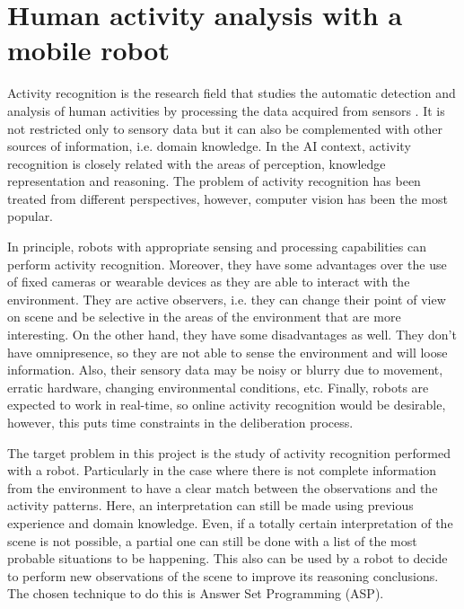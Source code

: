 \section{Human activity analysis with a mobile robot}
Activity recognition is the research field that studies the automatic detection and analysis of human activities by processing the data acquired from sensors \citep{Aggarwal14_HumActRec3DRev}. 
It is not restricted only to sensory data but it can also be complemented with other sources of information, i.e. domain knowledge.
In the AI context, activity recognition is closely related with the areas of perception, knowledge representation and reasoning. 
The problem of activity recognition has been treated from different perspectives, however, computer vision has been the most popular.

In principle, robots with appropriate sensing and processing capabilities can perform activity recognition. 
Moreover, they have some advantages over the use of fixed cameras or wearable devices as they are able to interact with the environment. 
They are active observers, i.e. they can change their point of view on scene and be selective in the areas of the environment that are more interesting. 
On the other hand, they have some disadvantages as well. 
They don't have omnipresence, so they are not able to sense the environment and will loose information. 
Also, their sensory data may be noisy or blurry due to movement, erratic hardware, changing environmental conditions, etc. 
Finally, robots are expected to work in real-time, so online activity recognition would be desirable, however, this puts time constraints in the deliberation process.


The target problem in this project is the study of activity recognition performed with a robot. 
Particularly in the case where there is not complete information from the environment to have a clear match between the observations and the activity patterns. 
Here, an interpretation can still be made using previous experience and domain knowledge. 
Even, if a totally certain interpretation of the scene is not possible, a partial one can still be done with a list of the most probable situations to be happening. 
This also can be used by a robot to decide to perform new observations of the scene to improve its reasoning conclusions. 
The chosen technique to do this is Answer Set Programming (ASP).

